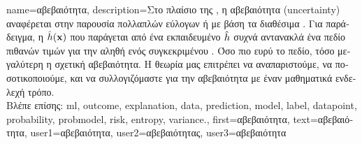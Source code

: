 {name={\foreignlanguage{greek}{αβεβαιότητα}},
	description={\foreignlanguage{greek}{Στο πλαίσιο της} , 
		\foreignlanguage{greek}{η αβεβαιότητα} (uncertainty) \foreignlanguage{greek}{αναφέρεται στην παρουσία πολλαπλών εύλογων} 
		 \foreignlanguage{greek}{ή}  \foreignlanguage{greek}{με βάση τα διαθέσιμα} 
		. \foreignlanguage{greek}{Για παράδειγμα, η}  $\hat{h}({\bf x})$ 
		\foreignlanguage{greek}{που παράγεται από ένα εκπαιδευμένο}   $\hat{h}$
	 	\foreignlanguage{greek}{συχνά αντανακλά ένα πεδίο πιθανών τιμών για την αληθή}  
		\foreignlanguage{greek}{ενός συγκεκριμένου} . \foreignlanguage{greek}{Όσο πιο ευρύ το 
		πεδίο, τόσο μεγαλύτερη η σχετική αβεβαιότητα. Η θεωρία}  \foreignlanguage{greek}{μας 
		επιτρέπει να αναπαριστούμε, να ποσοτικοποιούμε, και να συλλογιζόμαστε για την αβεβαιότητα με έναν 
		μαθηματικά ενδελεχή τρόπο.} 
		\\
		\foreignlanguage{greek}{Βλέπε επίσης:} \gls{ml}, \gls{outcome}, \gls{explanation}, \gls{data}, \gls{prediction}, \gls{model}, \gls{label}, 
		\gls{datapoint}, \gls{probability}, \gls{probmodel}, \gls{risk}, \gls{entropy}, \gls{variance}.},
	first={\foreignlanguage{greek}{αβεβαιότητα}},
	text={\foreignlanguage{greek}{αβεβαιότητα}},
	user1={\foreignlanguage{greek}{αβεβαιότητα}}, %
  	user2={\foreignlanguage{greek}{αβεβαιότητας}}, %
	user3={\foreignlanguage{greek}{αβεβαιότητα}} %
}

